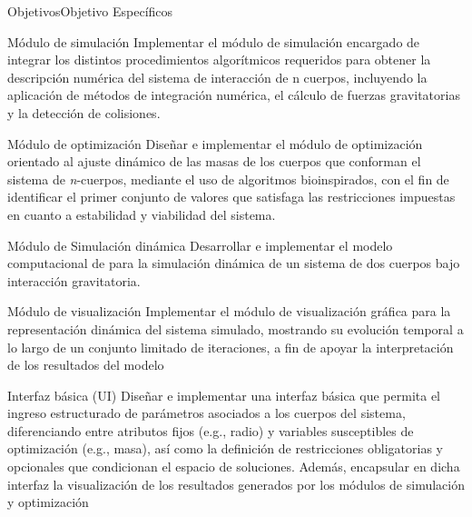 \begin{frame}[allowframebreaks]{Objetivos}{Objetivo Específicos}%
    \begin{block}{\fontsize{10pt}{12pt}\selectfont Módulo de simulación}{\fontsize{8pt}{10pt}\selectfont
        Implementar el módulo de simulación encargado de integrar los distintos procedimientos algorítmicos requeridos para obtener la descripción numérica del sistema de interacción de n cuerpos, incluyendo la aplicación de métodos de integración numérica, el cálculo de fuerzas gravitatorias y la detección de colisiones.
        }
    \end{block}
    \begin{block}{\fontsize{10pt}{12pt}\selectfont Módulo de optimización}{\fontsize{8pt}{10pt}\selectfont
        Diseñar e implementar el módulo de optimización orientado al ajuste dinámico de las masas de los cuerpos que conforman el sistema de \textit{n}-cuerpos, mediante el uso de algoritmos bioinspirados, con el fin de identificar el primer conjunto de valores que satisfaga las restricciones impuestas en cuanto a estabilidad y viabilidad del sistema.
        }
    \end{block}
    \framebreak%
    \begin{block}{\fontsize{10pt}{12pt}\selectfont Módulo de Simulación dinámica}{\fontsize{8pt}{10pt}\selectfont
        Desarrollar e implementar el modelo computacional de para la simulación dinámica de un sistema de dos cuerpos bajo interacción gravitatoria.
        }
    \end{block}
    \begin{block}{\fontsize{10pt}{12pt}\selectfont Módulo de visualización}{\fontsize{8pt}{10pt}\selectfont
        Implementar el módulo de visualización gráfica para la representación dinámica del sistema simulado, mostrando su evolución temporal a lo largo de un conjunto limitado de iteraciones, a fin de apoyar la interpretación de los resultados del modelo
        }
    \end{block}
    \framebreak%
    \begin{block}{\fontsize{10pt}{12pt}\selectfont Interfaz básica (UI)}{\fontsize{8pt}{10pt}\selectfont
        Diseñar e implementar una interfaz básica que permita el ingreso estructurado de parámetros asociados a los cuerpos del sistema, diferenciando entre atributos fijos (e.g., radio) y variables susceptibles de optimización (e.g., masa), así como la definición de restricciones obligatorias y opcionales que condicionan el espacio de soluciones. Además, encapsular en dicha interfaz la visualización de los resultados generados por los módulos de simulación y optimización
        }
    \end{block}
\end{frame}